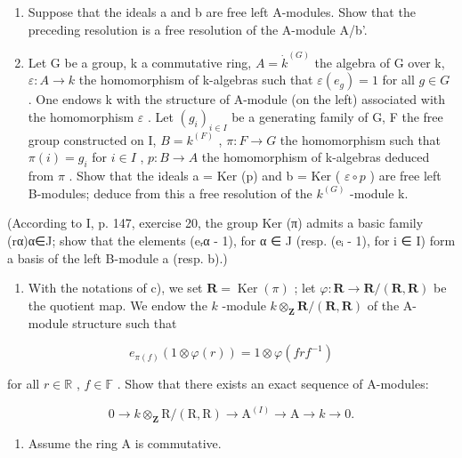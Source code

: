 \begin{enumerate}
\def\labelenumi{\alph{enumi})}
\setcounter{enumi}{1}
\item
  Suppose that the ideals a and b are free left A-modules. Show that the preceding resolution is a free resolution of the A-module A/b'.
\item
  Let G be a group, k a commutative ring, \(A = \dot{k}^{(G)}\) the algebra of G over k, \(\varepsilon : A \to k\) the homomorphism of k-algebras such that \(\varepsilon(e_g) = 1\) for all \(g \in G\) . One endows k with the structure of A-module (on the left) associated with the homomorphism \(\varepsilon\) . Let \((g_i)_{i \in I}\) be a generating family of G, F the free group constructed on I, \(B = k^{(F)}\) , \(\pi : F \to G\) the homomorphism such that \(\pi(i) = g_i\) for \(i \in I\) , \(p : B \to A\) the homomorphism of k-algebras deduced from \(\pi\) . Show that the ideals a = Ker (p) and b = Ker ( \(\varepsilon \circ p\) ) are free left B-modules; deduce from this a free resolution of the \(k^{(G)}\) -module k.
\end{enumerate}

(According to I, p. 147, exercise 20, the group Ker (π) admits a basic family (rα)α∈J; show that the elements (eᵣα - 1), for α ∈ J (resp. (eᵢ - 1), for i ∈ I) form a basis of the left B-module a (resp. b).)

\begin{enumerate}
\def\labelenumi{\alph{enumi})}
\setcounter{enumi}{3}
\tightlist
\item
  With the notations of c), we set \(\mathbf{R} = \operatorname{Ker}(\pi)\) ; let \(\varphi: \mathbf{R} \to \mathbf{R}/(\mathbf{R}, \mathbf{R})\) be the quotient map. We endow the \(k\) -module \(k \otimes_{\mathbf{Z}} \mathbf{R}/(\mathbf{R}, \mathbf{R})\) of the A-module structure such that
\end{enumerate}

\[
e _ {\pi (f)} \left(1 \otimes \varphi (r)\right) = 1 \otimes \varphi (f r f ^ {- 1})
\]

for all \(r \in \mathbb{R}\) , \(f \in \mathbb{F}\) . Show that there exists an exact sequence of A-modules:

\[
0 \rightarrow k \otimes_ {\mathbf {Z}} \mathrm{R} / (\mathrm{R}, \mathrm{R}) \rightarrow \mathrm{A} ^ {(I)} \rightarrow \mathrm{A} \rightarrow k \rightarrow 0.
\]

\begin{enumerate}
\def\labelenumi{\arabic{enumi})}
\setcounter{enumi}{3}
\tightlist
\item
  Assume the ring A is commutative.
\end{enumerate}

